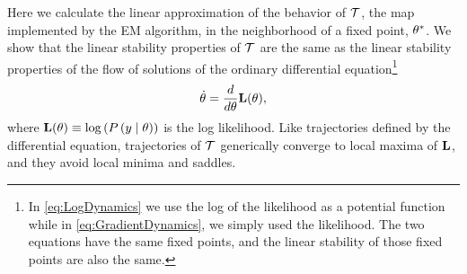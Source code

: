 \newcommand{\OldParameters}{\parameters}
\newcommand{\NewParameters}{\parameters'} %
Here we calculate the linear approximation of the behavior of
$\EMmap$, the map implemented by the EM algorithm, in the neighborhood
of a fixed point, ${\theta^*}$.  We show that the linear stability
properties of $\EMmap$ are the same as the linear stability properties
of the flow of solutions of the ordinary differential
equation\footnote{In \eqref{eq:LogDynamics} we use the log of the
  likelihood as a potential function while in
  \eqref{eq:GradientDynamics}, we simply used the likelihood.  The two
  equations have the same fixed points, and the linear stability of
  those fixed points are also the same.}
\begin{equation}
  \label{eq:LogDynamics}
  \dot {\theta} = \frac{d}{d \theta} 
  {\bf L}(\theta) ,
\end{equation}
where ${\bf L}(\theta) \equiv \log \left( P \left( y \mid
    \theta \right) \right)$ is the log likelihood. Like trajectories
defined by the differential equation, trajectories of $\EMmap$
generically converge to local maxima of ${\bf L}$, and they
avoid local minima and saddles.

